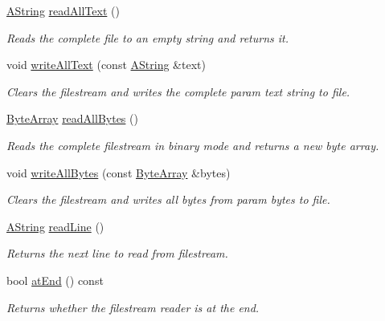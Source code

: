 \begin{DoxyCompactItemize}
\mbox{\hyperlink{class_a_string}{A\+String}} \mbox{\hyperlink{class_file_ad835c603c110f5e5d8359a9b271298dd}{read\+All\+Text}} ()
\begin{DoxyCompactList}\small\item\em Reads the complete file to an empty string and returns it. \end{DoxyCompactList}\item 
void \mbox{\hyperlink{class_file_a3d0bdb094fd754890130f27493792d05}{write\+All\+Text}} (const \mbox{\hyperlink{class_a_string}{A\+String}} \&text)
\begin{DoxyCompactList}\small\item\em Clears the filestream and writes the complete param text string to file. \end{DoxyCompactList}\item 
\mbox{\hyperlink{class_byte_array}{Byte\+Array}} \mbox{\hyperlink{class_file_acc44c7f319708f0e378c08492d178fc0}{read\+All\+Bytes}} ()
\begin{DoxyCompactList}\small\item\em Reads the complete filestream in binary mode and returns a new byte array. \end{DoxyCompactList}\item 
void \mbox{\hyperlink{class_file_a7fd6b7ead40f02ea7e578e281465bf80}{write\+All\+Bytes}} (const \mbox{\hyperlink{class_byte_array}{Byte\+Array}} \&bytes)
\begin{DoxyCompactList}\small\item\em Clears the filestream and writes all bytes from param bytes to file. \end{DoxyCompactList}\item 
\mbox{\hyperlink{class_a_string}{A\+String}} \mbox{\hyperlink{class_file_ad65ed49713d0b0e11a439cb3bc148171}{read\+Line}} ()
\begin{DoxyCompactList}\small\item\em Returns the next line to read from filestream. \end{DoxyCompactList}\item 
bool \mbox{\hyperlink{class_file_a6f433c3bbc327cf15217d2f3c4cd043d}{at\+End}} () const
\begin{DoxyCompactList}\small\item\em Returns whether the filestream reader is at the end. \end{DoxyCompactList}\end{DoxyCompactItemize}
